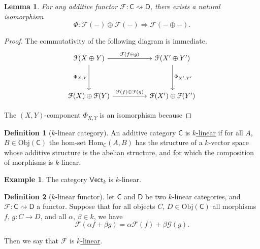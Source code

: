 \documentclass[a4paper,10pt]{scrreprt}
\newcommand{\defn}[1]{\ul{#1}}
\newcommand{\Obj}{\mathrm{Obj}}
\newcommand{\Hom}{\mathrm{Hom}}
\theoremstyle{definition}
\newtheorem{definition}{Definition}[section]
\newtheorem{example}{Example}[section]
\theoremstyle{plain}
\newtheorem{lemma}{Lemma}[section]
\theoremstyle{remark}
\begin{document}
\begin{lemma}
  For any additive functor $\mathcal{F}\colon \mathsf{C} \rightsquigarrow \mathsf{D}$, there exists a natural isomorphism 
  \begin{equation*}
    \Phi\colon \mathcal{F}(-) \oplus \mathcal{F}(-) \Rightarrow \mathcal{F}(- \oplus -).
  \end{equation*}
\end{lemma}
\begin{proof}
  The commutativity of the following diagram is immediate.
  \begin{equation*}
    \begin{tikzcd}[column sep=huge, row sep=huge]
      \mathcal{F}(X \oplus Y)
      \arrow[r, "\mathcal{F}(f \oplus g)"]
      \arrow[d, swap, "\Phi_{X, Y}"]
      & \mathcal{F}(X' \oplus Y')
      \arrow[d, "\Phi_{X', Y'}"]
      \\
      \mathcal{F}(X) \oplus \mathcal{F}(Y)
      \arrow[r, "\mathcal{F}(f) \oplus \mathcal{F}(g)"]
      & \mathcal{F}(X') \oplus \mathcal{F}(Y')
    \end{tikzcd}
  \end{equation*}

  The $(X, Y)$-component $\Phi_{X, Y}$ is an isomorphism because
\end{proof}

\begin{definition}[$k$-linear category]
  \label{def:linearcategory}
  An additive category $\mathsf{C}$ is \defn{$k$-linear} if for all $A$, $B \in \Obj(\mathsf{C})$ the hom-set $\Hom_{\mathsf{C}}(A, B)$ has the structure of a $k$-vector space whose additive structure is the abelian structure, and for which the composition of morphisms is $k$-linear.
\end{definition}

\begin{example}
  The category $\mathsf{Vect}_{k}$ is $k$-linear.
\end{example}

\begin{definition}[$k$-linear functor]
  \label{def:linearfunctor}
  let $\mathsf{C}$ and $\mathsf{D}$ be two $k$-linear categories, and $\mathcal{F}\colon \mathsf{C} \rightsquigarrow \mathsf{D}$ a functor. Suppose that for all objects $C$, $D \in \Obj(\mathsf{C})$ all morphisms $f$, $g\colon C \to D$, and all $\alpha$, $\beta \in k$, we have
  \begin{equation*}
    \mathcal{F}(\alpha f + \beta g) = \alpha \mathcal{F}(f) + \beta \mathcal{G}(g).
  \end{equation*}

  Then we say that $\mathcal{F}$ is \defn{$k$-linear}.
\end{definition}
\end{document}
